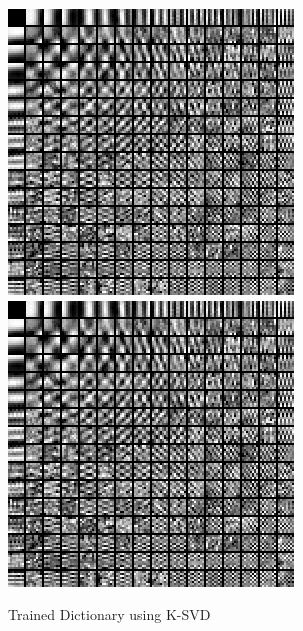 \begin{figure}[h]
{\begin{minipage}[b]{0.99\linewidth}
\includegraphics[width=0.23\linewidth]{images/DCT_dict.png}\vspace{4pt}
\includegraphics[width=0.23\linewidth]{images/DCT_dict.png}
\end{minipage}}
\caption{Trained Dictionary using K-SVD}
\end{figure}

